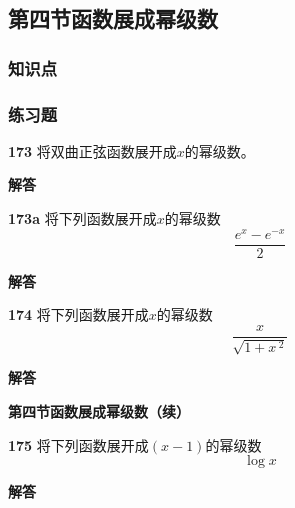 \documentclass[a4paper,10pt]{article} %
\begin{document}

\textheight

\newpage
\subsection{第四节\quad 函数展成幂级数}
\subsubsection{知识点}
\subsubsection{练习题}
\par\noindent \textbf{173} \quad 将双曲正弦函数展开成$x$的幂级数。
\par\noindent \textbf{ 解答}




\textheight


\par\noindent \textbf{173a} \quad 将下列函数展开成$x$的幂级数
$$\frac{e^x-e^{-x}}{2}$$
\par\noindent \textbf{ 解答}




\textheight


\par\noindent \textbf{174} \quad 将下列函数展开成$x$的幂级数
$$\frac{x}{\sqrt{1+x\,^2}}$$
\par\noindent \textbf{ 解答}




\textheight

\newpage
\par\noindent \textbf{第四节\quad 函数展成幂级数（续）}
\par\noindent \textbf{175} \quad 将下列函数展开成$(x-1)$的幂级数
$$\log x$$
\par\noindent \textbf{ 解答}
\end{document}
